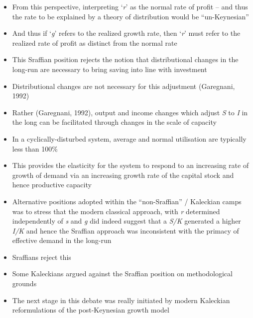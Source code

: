 \documentclass{article}
\begin{document}
	\begin{itemize}
		\item From this perspective, interpreting `\textit{r}' as the normal rate of profit -- and thus the rate to be explained by a theory of distribution would be ``un-Keynesian''
		\item And thus if `\textit{g}' refers to the realized growth rate, then `\textit{r}' must refer to the realized rate of profit as distinct from the normal rate
		\item This Sraffian position rejects the notion that distributional changes in the long-run are necessary to bring saving into line with investment
		\item Distributional changes are not necessary for this adjustment (Garegnani, 1992)
		\item Rather (Garegnani, 1992), output and income changes which adjust \textit{S} to \textit{I} in the long can be facilitated through changes in the scale of capacity
		\item In a cyclically-disturbed system, average and normal utilisation are typically less than 100\%
		\item This provides the elasticity for the system to respond to an increasing rate of growth of demand via an increasing growth rate of the capital stock and hence productive capacity
		\item Alternative positions adopted within the ``non-Sraffian'' / Kaleckian camps was to stress that the modern classical approach, with \textit{r} determined independently of \textit{s} and \textit{g} did indeed suggest that a \textit{S/K} generated a higher \textit{I/K} and hence the Sraffian approach was inconsistent with the primacy of effective demand in the long-run
		\item Sraffians reject this
		\item Some Kaleckians argued against the Sraffian position on methodological grounds
		\item The next stage in this debate was really initiated by modern Kaleckian reformulations of the post-Keynesian growth model
	\end{itemize}
\end{document}
